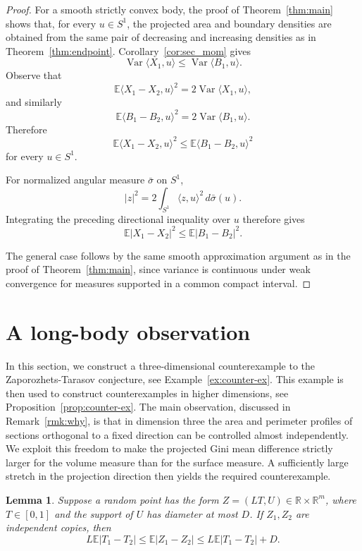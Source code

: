\documentclass[final,12pt]{elsarticle}
\numberwithin{equation}{section}
\newtheorem{lem}[thm]{Lemma}
\theoremstyle{remark}
\newcommand{\R}{\mathbb R}
\newcommand{\E}{\mathbb E}
\theoremstyle{definition}
\begin{document}
\begin{proof}
For a smooth strictly convex body, the proof of Theorem~\ref{thm:main}
shows that, for every $u\in S^1$, the projected area and boundary densities are
obtained from the same pair of decreasing and increasing densities as in
Theorem~\ref{thm:endpoint}. Corollary~\ref{cor:sec_mom}
gives
$$
\operatorname{Var}\langle X_1,u\rangle
\leq
\operatorname{Var}\langle B_1,u\rangle.
$$
Observe that
$$
\mathbb E\langle X_1-X_2,u\rangle^2
=
2\operatorname{Var}\langle X_1,u\rangle,
$$
and similarly
$$
\mathbb E\langle B_1-B_2,u\rangle^2
=
2\operatorname{Var}\langle B_1,u\rangle.
$$
Therefore
$$
\mathbb E\langle X_1-X_2,u\rangle^2
\leq
\mathbb E\langle B_1-B_2,u\rangle^2
$$
for every $u\in S^1$.

For normalized angular measure $\bar\sigma$ on $S^1$,
$$
|z|^2
=
2\int_{S^1}\langle z,u\rangle^2\,d\bar\sigma(u).
$$
Integrating the preceding directional inequality over $u$ therefore gives
$$
\mathbb E|X_1-X_2|^2
\leq
\mathbb E|B_1-B_2|^2.
$$

The general case follows by the same smooth approximation argument as in the proof
of Theorem~\ref{thm:main}, since variance is continuous under weak convergence
for measures supported in a common compact interval.
\end{proof}



\section{A long-body observation}
In this section, we construct a three-dimensional counterexample  to the Zaporozhets-Tarasov conjecture, see Example~\ref{ex:counter-ex}. This example is then used to construct counterexamples in higher dimensions, see Proposition~\ref{prop:counter-ex}. The
main observation, discussed in Remark~\ref{rmk:why}, is that in dimension
three the area and perimeter profiles of sections orthogonal to a fixed
direction can be controlled almost independently. We exploit this
freedom to make the projected Gini mean difference strictly larger for
the volume measure than for the surface measure. A sufficiently large
stretch in the projection direction then yields the required
counterexample. 

\begin{lem}\label{lem:axis}
Suppose a random point has the form $Z=(LT,U)\in\R\times\R^m$, where $T\in[0,1]$ and the support of $U$ has diameter at most $D$. If $Z_1,Z_2$ are independent copies, then
$$
L\E|T_1-T_2|\leq \E|Z_1-Z_2|\leq L\E|T_1-T_2|+D.
$$
\end{lem}
\end{document}

